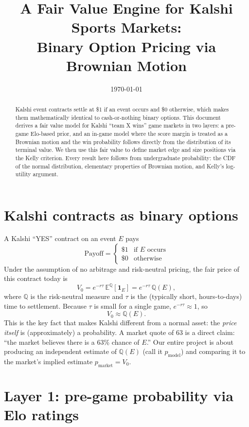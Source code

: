 \documentclass[11pt]{article}
\title{A Fair Value Engine for Kalshi Sports Markets:\\
\large Binary Option Pricing via Brownian Motion}
\author{}
\date{\today}
\begin{document}
\maketitle

\begin{abstract}
Kalshi event contracts settle at \$1 if an event occurs and \$0 otherwise,
which makes them mathematically identical to cash-or-nothing binary options.
This document derives a fair value model for Kalshi ``team X wins'' game
markets in two layers: a pre-game Elo-based prior, and an in-game model
where the score margin is treated as a Brownian motion and the win
probability follows directly from the distribution of its terminal value.
We then use this fair value to define market edge and size positions via
the Kelly criterion. Every result here follows from undergraduate
probability: the CDF of the normal distribution, elementary properties of
Brownian motion, and Kelly's log-utility argument.
\end{abstract}

\section{Kalshi contracts as binary options}

A Kalshi ``YES'' contract on an event $E$ pays
\[
\text{Payoff} =
\begin{cases}
\$1 & \text{if } E \text{ occurs} \\
\$0 & \text{otherwise}
\end{cases}
\]
Under the assumption of no arbitrage and risk-neutral pricing, the fair
price of this contract today is
\[
V_0 = e^{-r\tau}\,\mathbb{E}^{\mathbb{Q}}\!\left[\mathbf{1}_E\right]
    = e^{-r\tau}\, \mathbb{Q}(E),
\]
where $\mathbb{Q}$ is the risk-neutral measure and $\tau$ is the (typically
short, hours-to-days) time to settlement. Because $\tau$ is small for a
single game, $e^{-r\tau}\approx 1$, so
\[
V_0 \approx \mathbb{Q}(E).
\]
This is the key fact that makes Kalshi different from a normal asset: the
\emph{price itself} is (approximately) a probability. A market quote of
63\textcent{} is a direct claim: ``the market believes there is a 63\%
chance of $E$.'' Our entire project is about producing an independent
estimate of $\mathbb{Q}(E)$ (call it $p_{\text{model}}$) and comparing it to
the market's implied estimate $p_{\text{market}} = V_0$.

\section{Layer 1: pre-game probability via Elo ratings}
\end{document}
